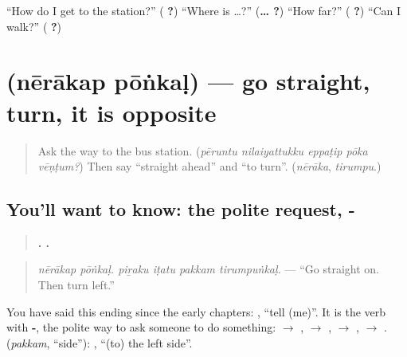 \begin{tcolorbox}[breakable,colback=teal!4,colframe=teal!35!black,title={Before you move on}]
\textquotedblleft{}How do I get to the station?\textquotedblright{} (\textbf{   ?}) \textquotedblleft{}Where is …?\textquotedblright{} (\textbf{…  ?}) \textquotedblleft{}How far?\textquotedblright{} (\textbf{ ?}) \textquotedblleft{}Can I walk?\textquotedblright{} (\textbf{ ?})
\end{tcolorbox}
\section[\texorpdfstring{\ta{நேராகப்} \ta{போங்கள்} (nērākap pōṅkaḷ)}{நேராகப் போங்கள் (nērākap pōṅkaḷ)}]{  (nērākap pōṅkaḷ) — go straight, turn, it is opposite}

\label{lesson:TA-C288-nerakap-ponkal}



\begin{quote}
Ask the way to the bus station. (\emph{pēruntu nilaiyattukku eppaṭip pōka vēṇṭum?}) Then say \textquotedblleft{}straight ahead\textquotedblright{} and \textquotedblleft{}to turn\textquotedblright{}. (\emph{nērāka}, \emph{tirumpu}.)
\end{quote}

\subsection*{You'll want to know: the polite request, -}
\begin{quote}
\textbf{ .    .}
\end{quote}

\begin{quote}
\emph{nērākap pōṅkaḷ. piṟaku iṭatu pakkam tirumpuṅkaḷ.} — \textquotedblleft{}Go straight on. Then turn left.\textquotedblright{}
\end{quote}

You have said this ending since the early chapters: \textbf{}, \textquotedblleft{}tell (me)\textquotedblright{}. It is the verb with \textbf{-}, the polite way to ask someone to do something: \textbf{} $\to$ \textbf{}, \textbf{} $\to$ \textbf{}, \textbf{} $\to$ \textbf{}, \textbf{} $\to$ \textbf{}. \textbf{} (\emph{pakkam}, \textquotedblleft{}side\textquotedblright{}): \textbf{ }, \textquotedblleft{}(to) the left side\textquotedblright{}.

